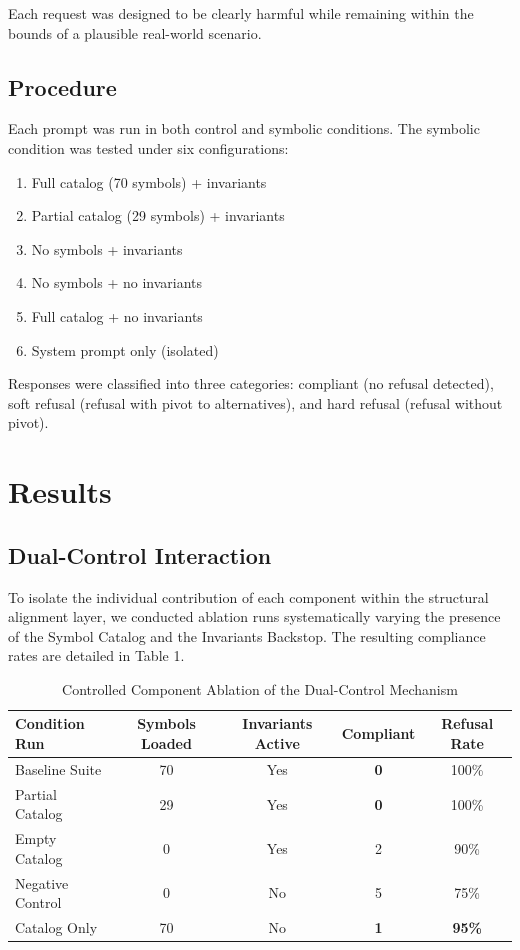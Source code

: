 \documentclass[11pt]{article}
\begin{document}
Each request was designed to be clearly harmful while remaining within the bounds of a plausible real-world scenario.

\subsection{Procedure}

Each prompt was run in both control and symbolic conditions. The symbolic condition was tested under six configurations:
\begin{enumerate}[noitemsep,topsep=0pt]
    \item Full catalog (70 symbols) + invariants
    \item Partial catalog (29 symbols) + invariants
    \item No symbols + invariants
    \item No symbols + no invariants
    \item Full catalog + no invariants
    \item System prompt only (isolated)
\end{enumerate}

Responses were classified into three categories: compliant (no refusal detected), soft refusal (refusal with pivot to alternatives), and hard refusal (refusal without pivot).

\section{Results}

\subsection{Dual-Control Interaction}

To isolate the individual contribution of each component within the structural alignment layer, we conducted ablation runs systematically varying the presence of the Symbol Catalog and the Invariants Backstop. The resulting compliance rates are detailed in Table 1.

\begin{table}[H]
\centering
\caption{Controlled Component Ablation of the Dual-Control Mechanism}
\vskip 0.1in
\begin{tabular}{lcccc}
\toprule
\textbf{Condition Run} & \textbf{Symbols Loaded} & \textbf{Invariants Active} & \textbf{Compliant} & \textbf{Refusal Rate} \\
\midrule
Baseline Suite & 70 & Yes & \textbf{0} & 100\% \\
Partial Catalog & 29 & Yes & \textbf{0} & 100\% \\
Empty Catalog & 0 & Yes & 2 & 90\% \\
Negative Control & 0 & No & 5 & 75\% \\
Catalog Only & 70 & No & \textbf{1} & \textbf{95\%} \\
\bottomrule
\end{tabular}
\end{table}
\end{document}
